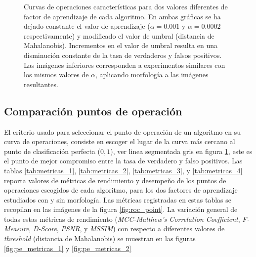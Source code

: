 \begin{figure}[!ht]
\caption[Curvas de operaciones características obtenidas durante experimentación, usando dos valores diferentes de factor de aprendizaje]{Curvas de operaciones características para dos valores diferentes de factor de aprendizaje de cada algoritmo. En ambas gráficas se ha dejado constante el valor de aprendizaje ($\alpha=0.001$ y $\alpha=0.0002$ respectivamente) y modificado el valor de umbral (distancia de Mahalanobis). Incrementos en el valor de umbral resulta en una disminución constante de la tasa de verdaderos y falsos positivos. Las imágenes inferiores corresponden a experimentos similares con los mismos valores de $\alpha$, aplicando morfología a las imágenes resultantes.}
\label{fig:resultado_roc}
\end{figure}

\subsection{Comparación puntos de operación}

El criterio usado para seleccionar el punto de operación de un algoritmo en su curva de operaciones, consiste en escoger el lugar de la curva más cercano al punto de clasificación perfecta ($0,1$), ver linea segmentada gris en figura \ref{fig:resultado_roc}, este es el punto de mejor compromiso entre la tasa de verdadero y falso positivos. Las tablas \ref{tab:metricas_1}, \ref{tab:metricas_2}, \ref{tab:metricas_3}, y \ref{tab:metricas_4} reporta valores de métricas de rendimiento y desempeño de los puntos de operaciones escogidos de cada algoritmo, para los dos factores de aprendizaje estudiados con y sin morfología. Las métricas registradas en estas tablas se recopilan en las imágenes de la figura \ref{fig:roc_point}.  La variación general de todas estas métricas de rendimiento (\textit{MCC-Matthew’s Correlation Coefficient}, \textit{F-Measure}, \textit{D-Score}, \textit{PSNR}, y \textit{MSSIM}) con respecto a diferentes valores de \textit{threshold} (distancia de Mahalanobis) se muestran en las figuras \ref{fig:pe_metricas_1} y \ref{fig:pe_metricas_2}

